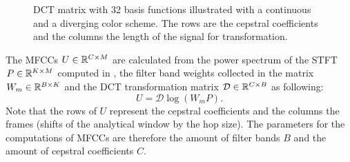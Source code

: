 \begin{figure}[!ht]
  \centering
  \qquad
  \caption{DCT matrix with 32 basis functions illustrated with a continuous and a diverging color scheme. The rows are the cepstral coefficients and the columns the length of the signal for transformation.}
  \label{fig:signal_mfcc_dct}
\end{figure}
\FloatBarrier
\noindent
The MFCCs $U \in \mathbb{R}^{C \times M}$ are calculated from the power spectrum of the STFT $P \in \mathbb{R}^{K \times M}$ computed in , the filter band weights collected in the matrix $W_m \in \mathbb{R}^{B \times K}$ and the DCT transformation matrix $\mathcal{D} \in \mathbb{R}^{C \times B}$ as following:
\begin{equation}\label{eq:signal_mfcc_mfcc}
  U = \mathcal{D} \log{ \left( W_m   P \right) }.
\end{equation}
Note that the rows of $U$ represent the cepstral coefficients and the columns the frames (shifts of the analytical window by the hop size).
The parameters for the computations of MFCCs are therefore the amount of filter bands $B$ and the amount of cepstral coefficients $C$.

